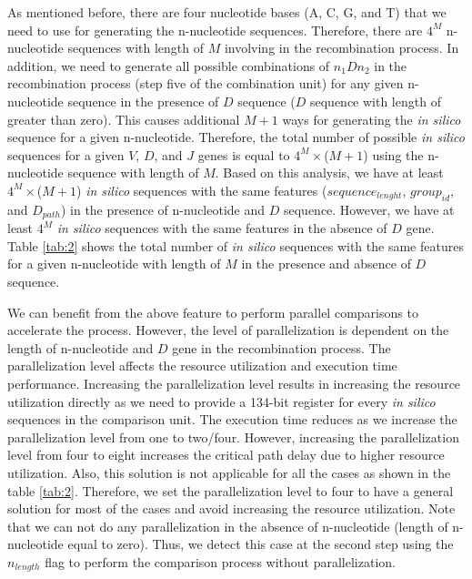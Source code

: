 As mentioned before, there are four nucleotide bases (A, C, G, and T) that we need to use for generating the n-nucleotide sequences. Therefore, there are $4^M$ n-nucleotide sequences with length of $M$ involving in the recombination process. In addition, we need to generate all possible combinations of $n_1Dn_2$ in the recombination process (step five of the combination unit) for any given n-nucleotide sequence in the presence of $D$ sequence ($D$ sequence with length of greater than zero). This causes additional $M+1$ ways for generating the \emph{in silico} sequence for a given n-nucleotide. Therefore, the total number of possible \emph{in silico} sequences for a given $V$, $D$, and $J$ genes is equal to $4^M \times $($M+1$) using the n-nucleotide sequence with length of $M$. Based on this analysis, we have at least $4^M \times $($M+1$) \emph{in silico} sequences with the same features ($sequence_{lenght}$, $group_{id}$, and $D_{path}$) in the presence of n-nucleotide and $D$ sequence. However, we have at least $4^M$ \emph{in silico} sequences with the same features in the absence of $D$ gene. Table \ref{tab:2} shows the total number of \emph{in silico} sequences with the same features for a given n-nucleotide with length of $M$ in the presence and absence of $D$ sequence. 

We can benefit from the above feature to perform parallel comparisons to accelerate the process. However, the level of parallelization is dependent on the length of n-nucleotide and $D$ gene in the recombination process. The parallelization level affects the resource utilization and execution time performance. Increasing the parallelization level results in increasing the resource utilization directly as we need to provide a 134-bit register for every \emph{in silico} sequences in the comparison unit. The execution time reduces as we increase the parallelization level from one to two/four. However, increasing the parallelization level from four to eight increases the critical path delay due to higher resource utilization. Also, this solution is not applicable for all the cases as shown in the table \ref{tab:2}. Therefore, we set the parallelization level to four to have a general solution for most of the cases and avoid increasing the resource utilization. Note that we can not do any parallelization in the absence of n-nucleotide (length of n-nucleotide equal to zero). Thus, we detect this case at the second step using the $n_{length}$ flag to perform the comparison process without parallelization. 

